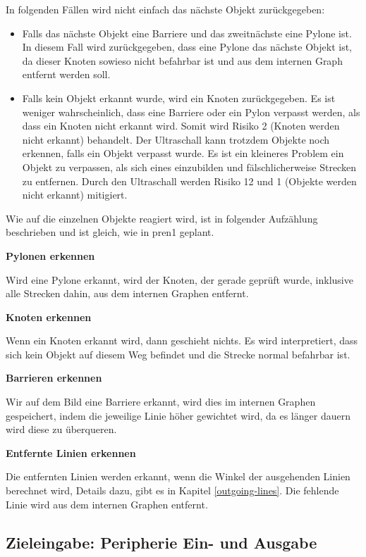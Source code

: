 In folgenden Fällen wird nicht einfach das nächste Objekt zurückgegeben:

\begin{itemize}
    \item Falls das nächste Objekt eine Barriere und das zweitnächste eine Pylone ist. In diesem Fall wird zurückgegeben, dass eine Pylone das nächste Objekt ist, da dieser Knoten sowieso nicht befahrbar ist und aus dem internen Graph entfernt werden soll.
    \item Falls kein Objekt erkannt wurde, wird ein Knoten zurückgegeben. Es ist weniger wahrscheinlich, dass eine Barriere oder ein Pylon verpasst werden, als dass ein Knoten nicht erkannt wird. Somit wird Risiko 2 (Knoten werden nicht erkannt) behandelt. Der Ultraschall kann trotzdem Objekte noch erkennen, falls ein Objekt verpasst wurde. Es ist ein kleineres Problem ein Objekt zu verpassen, als sich eines einzubilden und fälschlicherweise Strecken zu entfernen. Durch den Ultraschall werden Risiko 12 und 1 (Objekte werden nicht erkannt) mitigiert.
\end{itemize}


Wie auf die einzelnen Objekte reagiert wird, ist in folgender Aufzählung beschrieben und ist gleich, wie in \acrshort{pren1} geplant.

\textbf{Pylonen erkennen}

Wird eine Pylone erkannt, wird der Knoten, der gerade geprüft wurde, inklusive alle Strecken dahin, aus dem internen Graphen entfernt.

\textbf{Knoten erkennen}

Wenn ein Knoten erkannt wird, dann geschieht nichts. Es wird interpretiert, dass sich kein Objekt auf diesem Weg befindet und die Strecke normal befahrbar ist.

\textbf{Barrieren erkennen}

Wir auf dem Bild eine Barriere erkannt, wird dies im internen Graphen gespeichert, indem die jeweilige Linie höher gewichtet wird, da es länger dauern wird diese zu überqueren.

\textbf{Entfernte Linien erkennen}

Die entfernten Linien werden erkannt, wenn die Winkel der ausgehenden Linien berechnet wird, Details dazu, gibt es in Kapitel \ref{outgoing-lines}. Die fehlende Linie wird aus dem internen Graphen entfernt.

\newpage
\subsection{Zieleingabe: Peripherie Ein- und Ausgabe}

